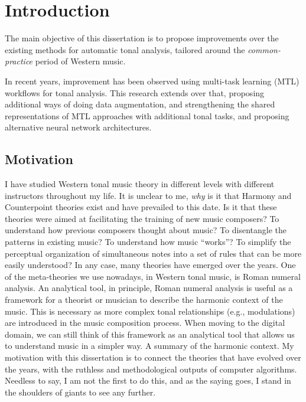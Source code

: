 \chapter{Introduction}
\label{chap:introduction}

    


The main objective of this dissertation is to propose improvements over the existing methods for automatic tonal analysis, tailored around the \emph{common-practice} period of Western music. 

In recent years, improvement has been observed using multi-task learning (MTL) workflows for tonal analysis.
This research extends over that, proposing additional ways of doing data augmentation, and strengthening the shared representations of MTL approaches with additional tonal tasks, and proposing alternative neural network architectures.

\section{Motivation}

I have studied Western tonal music theory in different levels with different instructors throughout my life.
It is unclear to me, \emph{why} is it that Harmony and Counterpoint theories exist and have prevailed to this date.
Is it that these theories were aimed at facilitating the training of new music composers? 
To understand how previous composers thought about music? 
To disentangle the patterns in existing music? 
To understand how music ``works''? 
To simplify the perceptual organization of simultaneous notes into a set of rules that can be more easily understood?
In any case, many theories have emerged over the years.
One of the meta-theories we use nowadays, in Western tonal music, is Roman numeral analysis.
An analytical tool, in principle, Roman numeral analysis is useful as a framework for a theorist or musician to describe the harmonic context of the music.
This is necessary as more complex tonal relationships (e.g., modulations) are introduced in the music composition process.
When moving to the digital domain, we can still think of this framework as an analytical tool that allows us to understand music in a simpler way.
A summary of the harmonic context.
My motivation with this dissertation is to connect the theories that have evolved over the years, with the ruthless and methodological outputs of computer algorithms.
Needless to say, I am not the first to do this, and as the saying goes, I stand in the shoulders of giants to see any further.

